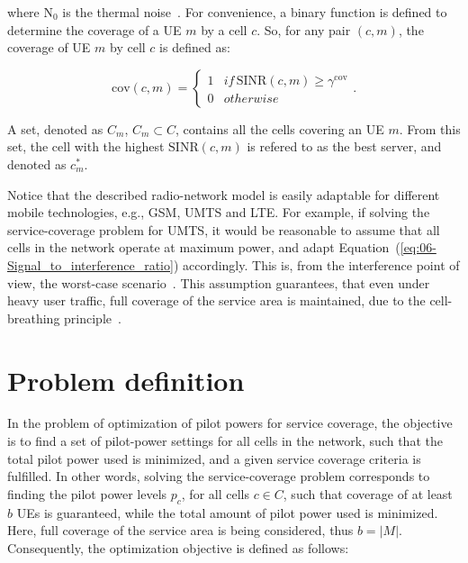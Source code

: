 \noindent where $\mathrm{N}_{0}$
is the thermal noise~\cite{RadioNetworkPlanningAndOptimisationForUMTS}.
For convenience, a binary function is defined to determine the coverage
of a UE $m$ by a cell $c$. So, for any pair $(c,m)$, the coverage
of UE $m$ by cell $c$ is defined as:

\begin{equation}
\mathrm{cov}(c,m)=\begin{cases}
1 & if\,\mathrm{SINR}(c,m)\ge\gamma^{\mathrm{cov}}\\
0 & otherwise
\end{cases}.
\end{equation}


\noindent {}

\noindent A set, denoted as $C_{m}$,
$C_{m}\subset C$, contains all the cells covering an UE $m$. From
this set, the cell with the highest $\mathrm{SINR}(c,m)$ is refered
to as the best server, and denoted as $c_{m}^{*}$.

\noindent Notice that the described radio-network model is easily
adaptable for different mobile technologies, e.g., GSM, UMTS and LTE.
For example, if solving the service-coverage problem for UMTS, it
would be reasonable to assume that all cells in the network operate
at maximum power, and adapt Equation~(\ref{eq:06-Signal_to_interference_ratio})
accordingly. This is, from the interference point of view, the worst-case
scenario~\cite{Chen-Yuan_CPICH.optimization:2008,Siomina:Minimum.pilot.power.for.service.coverage}.
This assumption guarantees, that even under heavy user traffic, full
coverage of the service area is maintained, due to the cell-breathing
principle~\cite{Holma_WCDMA.for.UMTS:2005}.


\section{Problem definition}

In the problem of optimization of pilot powers for service coverage,
the objective is to find a set of pilot-power settings for all cells
in the network, such that the total pilot power used is minimized,
and a given service coverage criteria is fulfilled. In other words,
solving the service-coverage problem corresponds to finding the pilot
power levels $p_{c}$, for all cells $c\in C$, such that coverage
of at least $b$ UEs is guaranteed, while the total amount of pilot
power used is minimized. Here, full coverage of the service area is
being considered, thus $b=\vert M\vert$. Consequently, the optimization
objective is defined as follows:

